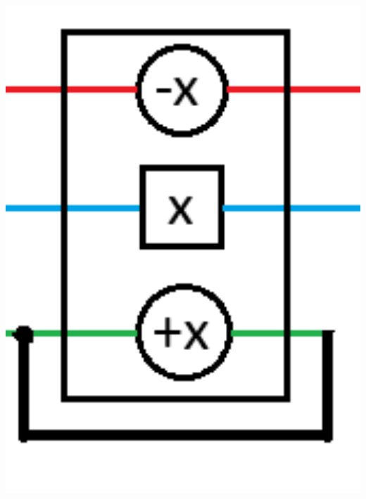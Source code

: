 \documentclass{beamer}
\begin{document}
\begin{frame}
\begin{minipage}[t]{0.49\textwidth}
    \includegraphics[width=1\textwidth]{res/OpenOptinalSim.png}
  \end{minipage}
\end{frame}
\end{document}
